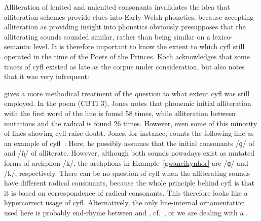 Alliteration of lenited and unlenited consonants  invalidates the idea that alliteration schemes provide clues into Early Welsh phonetics, because accepting alliteration as providing insight into phonetics obviously presupposes that the alliterating sounds sounded similar, rather than being similar on a lexico-semantic level. It is therefore important to know the extent to which \gls{cyfl} still operated in the time of the Poets of the Princes. Koch acknowledges that some traces of \gls{cyfl} existed as late as the corpus under consideration, but also notes that it was very infrequent:

\Textcite{jones_meddwl_2005} gives a more methodical treatment of the question to what extent \gls{cyfl} was still employed. In the poem  (\acrshort{CBTI} 3), Jones notes that phonemic initial alliteration with the first word of the line is found 58 times, while alliteration between mutations and the radical is found 26 times. 
However, even some of this minority of lines showing  \gls{cyfl} raise doubt. Jones, for instance, counts the following line as an example of \gls{cyfl}~\parencite[162]{jones_meddwl_2005}:
Here, he possibly assumes that the initial consonants /ɡ/ of  and /ŋ̊/ of  alliterate. However, although both sounds nowadays exist as mutated forms of \gls{archphon} /k/, the \gls{archphon}s in Example~\ref{gwaneikynhor}  are /ɡ/ and /k/, respectively. There can be no question of \gls{cyfl} when the alliterating sounds have different radical consonants, because the whole principle behind \gls{cyfl} is that it is based on correspondence of radical consonants. This therefore looks like a hypercorrect usage of \gls{cyfl}. Alternatively, the only line-internal ornamentation used here is probably end-rhyme between  and , cf.\ \textcite[xlvii]{andrews_welsh_2007}, or we are dealing with a .

